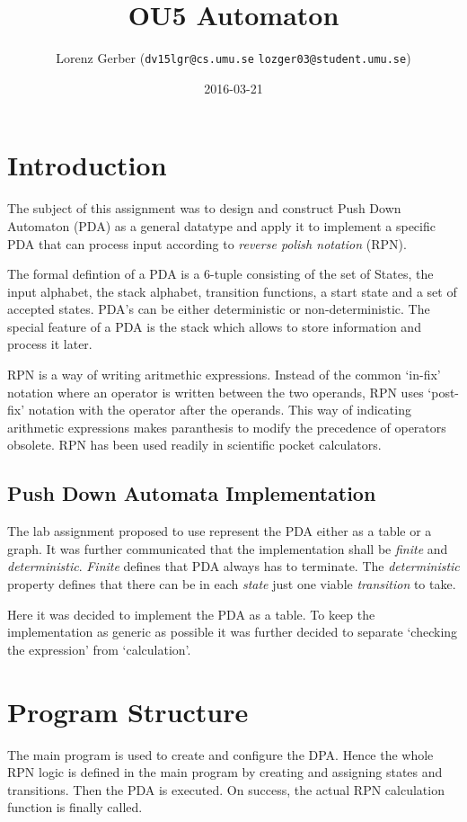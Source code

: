 \documentclass[a4paper,11pt,twoside]{article}
\title{OU5 Automaton}
\author{Lorenz Gerber ({\tt{dv15lgr@cs.umu.se}} {\tt{lozger03@student.umu.se}})}
\date{2016-03-21}
\begin{document}
\lstset{language=C}
\maketitle
\thispagestyle{empty}
\newpage
\tableofcontents
\thispagestyle{empty}
\newpage

\clearpage
{}

\section{Introduction} 
The subject of this assignment was to design and construct Push Down
Automaton (PDA) as a general datatype and apply it to implement a
specific PDA that can process input according to \textit{reverse
  polish notation} (RPN).

The formal defintion of a PDA is a 6-tuple consisting of the set of
States, the input alphabet, the stack alphabet, transition functions,
a start state and a set of accepted states. PDA's can be either
deterministic or non-deterministic. The special feature of a PDA is
the stack which allows to store information and process it later. 

RPN is a way of writing aritmethic expressions. Instead of the common
`in-fix' notation where an operator is written between the two
operands, RPN uses `post-fix' notation with the operator after the
operands. This way of indicating arithmetic expressions makes
paranthesis to modify the precedence of operators obsolete. RPN has
been used readily in scientific pocket calculators. 

\subsection{Push Down Automata Implementation}
The lab assignment proposed to use represent the PDA either as a table or
a graph. It was further communicated that the implementation shall be
\textit{finite} and \textit{deterministic}. \textit{Finite} defines that PDA
always has to terminate. The \textit{deterministic} property defines
that there can be in each \textit{state} just one viable
\textit{transition} to take.  

Here it was decided to implement the PDA as a table. To keep the
implementation as generic as possible it was further decided to
separate `checking the expression' from `calculation'. 




\section{Program Structure}
The main program is used to create and configure the DPA. Hence the
whole RPN logic is defined in the main program by creating and
assigning states and transitions. Then the PDA is executed. On
success, the actual RPN calculation function is finally called.
\end{document}
